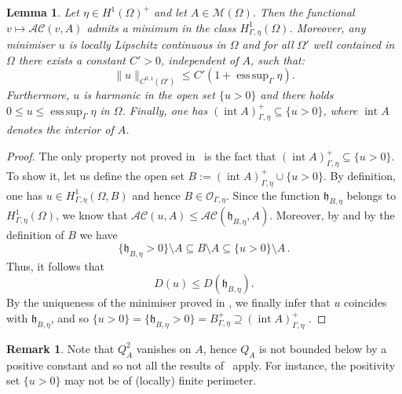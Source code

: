 \documentclass[a4paper,11pt,reqno]{amsart}
\numberwithin{equation}{section}
\newtheorem{lemma}[teo]{Lemma}
\theoremstyle{definition}
\newtheorem{remark}[teo]{Remark}
\theoremstyle{remark}
\DeclareMathOperator{\inter}{int}
\DeclareMathOperator*{\esssup}{ess\, sup}
\begin{document}
\begin{lemma}\label{lemma:minimiser_AltCaffarelli}
Let $\eta\in H^1(\Omega)^+$ and let $A\in \mathcal M(\Omega)$. Then the functional $v\mapsto \mathcal{AC}(v,A)$ admits a minimum in the class $H^1_{\Gamma,\eta}(\Omega)$. Moreover, any minimiser $u$ is locally Lipschitz continuous in $\Omega$ and for all $\Omega'$ well contained in $\Omega$ there exists a constant $C'>0$, independent of $A$, such that:
\begin{equation}
    \|u\|_{C^{0,1}(\Omega')}\leq C'(1+\esssup_\Gamma\eta).
\end{equation}
Furthermore, $u$ is harmonic in the open set $\{u>0\}$ and there holds $0\leq u\leq \esssup_\Gamma\eta$ in $\Omega$. Finally, one has $(\inter A)^+_{\Gamma,\eta}\subseteq\{u>0\}$, where $\inter A$ denotes the interior of $A$.
\end{lemma}

\begin{proof} 
    The only property not proved in~\cite{ALT1981} is the fact that $(\inter A)^+_{\Gamma,\eta}\subseteq\{u>0\}$. To show it, let us define the open set $B:= (\inter A)^+_{\Gamma,\eta} \cup \{u>0\}$. By definition, one has $u\in H^1_{\Gamma, \eta}(\Omega, B)$ and hence $B\in \mathcal O_{\Gamma,\eta}$. Since the function $\mathfrak{h}_{B,\eta}$ belongs to $H^1_{\Gamma,\eta}(\Omega)$, we know that $\mathcal{AC}( u, A)\leq \mathcal{AC}(\mathfrak{h}_{B,\eta}, A)$.
    Moreover, by  and by the definition of $B$ we have
    \begin{equation}
        \{ \mathfrak{h}_{B,\eta}>0\} \setminus A \subseteq B \setminus A \subseteq \{ u>0\}\setminus A \,.
    \end{equation}
    Thus, it follows that
    \begin{equation}
        D(u)\le D(\mathfrak{h}_{B,\eta}).
   \end{equation}
    By the uniqueness of the minimiser proved in , we finally infer that $u$ coincides with $\mathfrak{h}_{B,\eta}$, and so $\{u > 0\}=\{\mathfrak{h}_{B,\eta} > 0\}=B^+_{\Gamma,\eta}\supseteq(\inter A)^+_{\Gamma,\eta}$ .
\end{proof}

\begin{remark}
    Note that $Q^2_A$ vanishes on $A$, hence $Q_A$ is not bounded below by a positive constant and so not all the results of~\cite{ALT1981} apply. For instance, the positivity set $\{u>0\}$ may not be of (locally) finite perimeter.
\end{remark}
\end{document}
